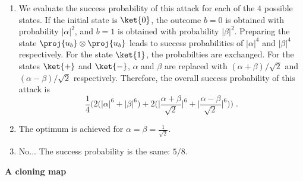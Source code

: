 \begin{exercises}
\begin{enumerate}
\item We evaluate the success probability of this attack for each of the $4$ possible states. If the initial state is $\ket{0}$, the outcome $b=0$ is obtained with probability $|\alpha|^2$, and $b=1$ is obtained with probability $|\beta|^2$. Preparing the state $\proj{u_b} \otimes \proj{u_b}$ leads to success probabilities of $|\alpha|^4$ and $|\beta|^4$ respectively. For the state $\ket{1}$, the probabilties are exchanged. For the states $\ket{+}$ and $\ket{-}$, $\alpha$ and $\beta$ are replaced with $(\alpha + \beta)/\sqrt{2}$ and $(\alpha-\beta)/\sqrt{2}$ respectively. Therefore, the overall success probability of this attack is 
\[ \frac{1}{4}\Big( 2 \big( |\alpha|^6 + |\beta|^6\big) + 2\Big( \Big| \frac{\alpha + \beta}{\sqrt{2}}\Big|^6
+\Big| \frac{\alpha - \beta}{\sqrt{2}}\Big|^6\Big)\Big)\;.\]
\item The optimum is achieved for $\alpha=\beta=\frac{1}{\sqrt{2}}$. 
\item No... The success probability is the same: $5/8$. 
\end{enumerate}


\item {\bf A cloning map}\label{ex:2-qmamp}


\end{exercises}
